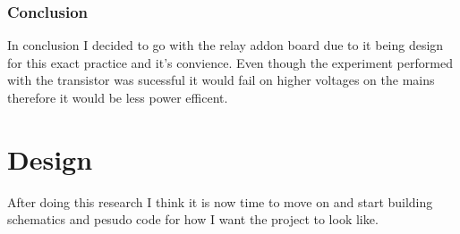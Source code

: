\documentclass{article}
\begin{document}
\subsubsection{Conclusion}
In conclusion I decided to go with the relay addon board due to it being design for this exact practice and
it's convience. Even though the experiment performed with the transistor was sucessful it would fail on
higher voltages on the mains therefore it would be less power efficent.

\section{Design}

After doing this research I think it is now time to move on and start building schematics and pesudo code
for how I want the project to look like.
\end{document}
